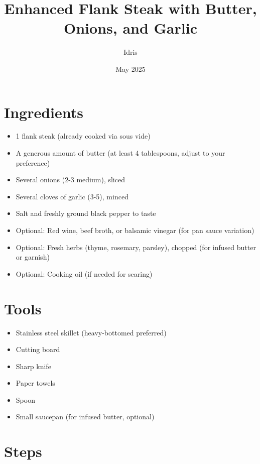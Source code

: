 \documentclass[openany, 12pt]{article}
\title{Enhanced Flank Steak with Butter, Onions, and Garlic}
\author{Idris}
\date{May 2025}
\begin{document}
\maketitle
\tableofcontents

\section{Ingredients}
\begin{itemize}
	\item 1 flank steak (already cooked via sous vide)
	\item A generous amount of butter (at least 4 tablespoons, adjust to your preference)
	\item Several onions (2-3 medium), sliced
	\item Several cloves of garlic (3-5), minced
	\item Salt and freshly ground black pepper to taste
	\item Optional: Red wine, beef broth, or balsamic vinegar (for pan sauce variation)
	\item Optional: Fresh herbs (thyme, rosemary, parsley), chopped (for infused butter or garnish)
	\item Optional: Cooking oil (if needed for searing)
\end{itemize}

\section{Tools}
\begin{itemize}
	\item Stainless steel skillet (heavy-bottomed preferred)
	\item Cutting board
	\item Sharp knife
	\item Paper towels
	\item Spoon
	\item Small saucepan (for infused butter, optional)
\end{itemize}

\section{Steps}
\end{document}
